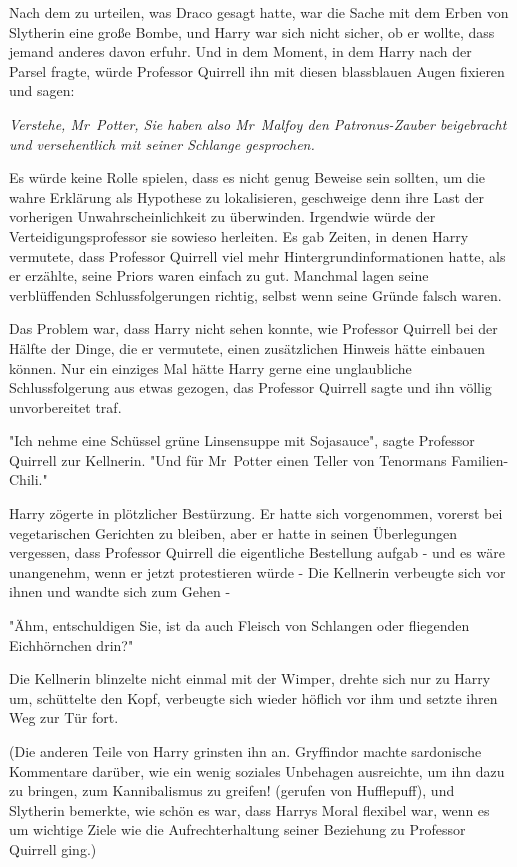 {Nach dem zu urteilen, was Draco gesagt hatte, war die Sache mit dem Erben von Slytherin eine große Bombe, und Harry war sich nicht sicher, ob er wollte, dass jemand anderes davon erfuhr. Und in dem Moment, in dem Harry nach der Parsel fragte, würde Professor Quirrell ihn mit diesen blassblauen Augen fixieren und sagen:

\emph{Verstehe, Mr~Potter, Sie haben also Mr~Malfoy den Patronus-Zauber beigebracht und versehentlich mit seiner Schlange gesprochen.}

Es würde keine Rolle spielen, dass es nicht genug Beweise sein sollten, um die wahre Erklärung als Hypothese zu lokalisieren, geschweige denn ihre Last der vorherigen Unwahrscheinlichkeit zu überwinden. Irgendwie würde der Verteidigungsprofessor sie sowieso herleiten. Es gab Zeiten, in denen Harry vermutete, dass Professor Quirrell viel mehr Hintergrundinformationen hatte, als er erzählte, seine Priors waren einfach zu gut. Manchmal lagen seine verblüffenden Schlussfolgerungen richtig, selbst wenn seine Gründe falsch waren.

Das Problem war, dass Harry nicht sehen konnte, wie Professor Quirrell bei der Hälfte der Dinge, die er vermutete, einen zusätzlichen Hinweis hätte einbauen können. Nur ein einziges Mal hätte Harry gerne eine unglaubliche Schlussfolgerung aus etwas gezogen, das Professor Quirrell sagte und ihn völlig unvorbereitet traf.

"Ich nehme eine Schüssel grüne Linsensuppe mit Sojasauce", sagte Professor Quirrell zur Kellnerin. "Und für Mr~Potter einen Teller von Tenormans Familien-Chili."

Harry zögerte in plötzlicher Bestürzung. Er hatte sich vorgenommen, vorerst bei vegetarischen Gerichten zu bleiben, aber er hatte in seinen Überlegungen vergessen, dass Professor Quirrell die eigentliche Bestellung aufgab - und es wäre unangenehm, wenn er jetzt protestieren würde - Die Kellnerin verbeugte sich vor ihnen und wandte sich zum Gehen -

"Ähm, entschuldigen Sie, ist da auch Fleisch von Schlangen oder fliegenden Eichhörnchen drin?"

Die Kellnerin blinzelte nicht einmal mit der Wimper, drehte sich nur zu Harry um, schüttelte den Kopf, verbeugte sich wieder höflich vor ihm und setzte ihren Weg zur Tür fort.

(Die anderen Teile von Harry grinsten ihn an. Gryffindor machte sardonische Kommentare darüber, wie ein wenig soziales Unbehagen ausreichte, um ihn dazu zu bringen, zum Kannibalismus zu greifen! (gerufen von Hufflepuff), und Slytherin bemerkte, wie schön es war, dass Harrys Moral flexibel war, wenn es um wichtige Ziele wie die Aufrechterhaltung seiner Beziehung zu Professor Quirrell ging.)

}
